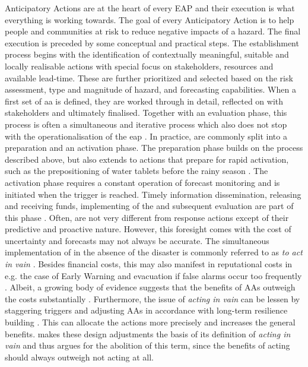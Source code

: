 Anticipatory Actions are at the heart of every EAP and their execution is what everything is working towards. The goal of every Anticipatory Action is to help people and communities at risk to reduce negative impacts of a hazard. The final execution is preceded by some conceptual and practical steps. The establishment process begins with the identification of contextually meaningful, suitable and locally realisable actions with special focus on stakeholders, resources and available lead-time. These are further prioritized and selected based on the risk assessment, type and magnitude of hazard, and forecasting capabilities. When a first set of \acrshort*{aa} is defined, they are worked through in detail, reflected on with stakeholders and ultimately finalised. Together with an evaluation phase, this process is often a simultaneous and iterative process which also does not stop with the operationalisation of the \acrshort{eap} \autocite{elisabethstephensFORECASTBASEDACTION2015,ifrcGlossaryTermsForecastbased2023,ifrcFbFPractitionersManual2023a,rcrcFORECASTBASEDFINANCINGEARLY2020}.
In practice,  are commonly split into a preparation and an activation phase. The preparation phase builds on the process described above, but also extends to actions that prepare for rapid activation, such as the prepositioning of water tablets before the rainy season \autocite{elisabethstephensFORECASTBASEDACTION2015}. The activation phase requires a constant operation of forecast monitoring and is initiated when the trigger is reached. Timely information dissemination, releasing and receiving funds, implementing of the  and subsequent evaluation are part of this phase \autocite{elisabethstephensFORECASTBASEDACTION2015,ifrcFbFPractitionersManual2023a}. Often,  are not very different from response actions except of their predictive and proactive nature. However, this foresight comes with the cost of uncertainty and forecasts may not always be accurate. The simultaneous implementation of  in the absence of the disaster is commonly referred to as \textit{to act in vain} \autocite{coughlandeperezForecastbasedFinancingApproach2015}. Besides financial costs, this may also manifest in reputational costs in e.g. the case of Early Warning and evacuation if false alarms occur too frequently \autocite{elisabethstephensFORECASTBASEDACTION2015}. Albeit, a growing body of evidence suggests that the benefits of AAs outweigh the costs substantially \autocite{cabotventonEconomicsResilienceDrought2018,coughlandeperezForecastbasedFinancingApproach2015,gualazziniEWEAEarlyWarning2021}. Furthermore, the issue of \textit{acting in vain} can be lessen by staggering triggers and adjusting AAs in accordance with long-term resilience building \autocite{wfpMonitoringEvaluationAnticipatory2021}. This can allocate the actions more precisely and increases the general benefits. \autocite{ifrcGlossaryTermsForecastbased2023} makes these design adjustments the basis of its definition of \textit{acting in vain} and thus argues for the abolition of this term, since the benefits of acting should always outweigh not acting at all.


